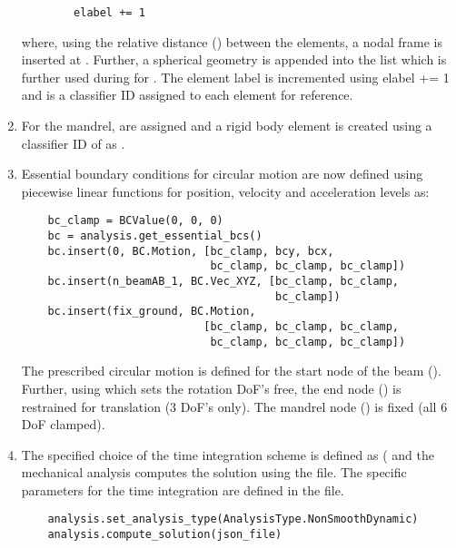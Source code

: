 \begin{enumerate}
\begin{tcolorbox}
\begin{lstlisting}
        elabel += 1
    \end{lstlisting}\end{tcolorbox}    
   where, using the relative distance () between the elements, a nodal frame is inserted at . Further, a spherical geometry is appended into the list  which is further used during  for . The element label  is incremented using elabel += 1 and \pythoninline{[10]} is a classifier ID assigned to each element for reference.
    \item For the mandrel,  are assigned and a rigid body element is created using a classifier ID of \pythoninline{[298]} as . 
    \item Essential boundary conditions for circular motion are now defined using piecewise linear functions  for position, velocity and acceleration levels as:
    \pythonstyle
    \begin{tcolorbox}\begin{lstlisting}
    bc_clamp = BCValue(0, 0, 0)
    bc = analysis.get_essential_bcs()
    bc.insert(0, BC.Motion, [bc_clamp, bcy, bcx, 
                             bc_clamp, bc_clamp, bc_clamp])
    bc.insert(n_beamAB_1, BC.Vec_XYZ, [bc_clamp, bc_clamp, 
                                       bc_clamp])
    bc.insert(fix_ground, BC.Motion,
                            [bc_clamp, bc_clamp, bc_clamp, 
                             bc_clamp, bc_clamp, bc_clamp])
    \end{lstlisting}\end{tcolorbox}
    The prescribed circular motion is defined for the start node of the beam (). Further, using  which sets the rotation DoF's free, the end node () is restrained for translation (3 DoF's only). The mandrel node () is fixed (all 6 DoF clamped).        
    \item The specified choice of the time integration scheme is defined as ( and the mechanical analysis computes the solution using the  file. The specific parameters for the time integration are defined in the  file.
    \pythonstyle
    \begin{tcolorbox}\begin{lstlisting}
    analysis.set_analysis_type(AnalysisType.NonSmoothDynamic)
    analysis.compute_solution(json_file)
    \end{lstlisting}\end{tcolorbox}    
\end{enumerate}

